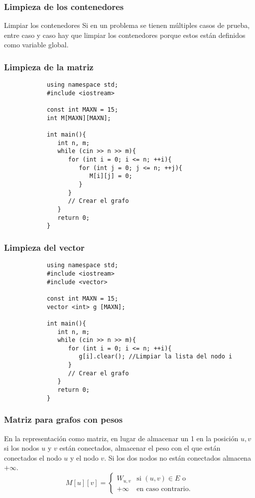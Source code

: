 \documentclass{beamer}
\begin{document}
	\begin{frame}[fragile]
		\frametitle{Limpieza de los contenedores}
		\begin{block}{Limpiar los contenedores}
			Si en un problema se tienen múltiples casos de prueba, entre caso y caso hay que limpiar los contenedores porque estos están definidos como variable global.
		\end{block}
	\end{frame}
	
	\begin{frame}[fragile]
		\frametitle{Limpieza de la matriz}
		\begin{lstlisting}
			using namespace std;
			#include <iostream>

			const int MAXN = 15;
			int M[MAXN][MAXN];

			int main(){
			   int n, m;
			   while (cin >> n >> m){
			      for (int i = 0; i <= n; ++i){
			         for (int j = 0; j <= n; ++j){
			            M[i][j] = 0;
			         }
			      }   
			      // Crear el grafo
			   }
			   return 0;
			}
		\end{lstlisting}
	\end{frame}
	
	\begin{frame}[fragile]
		\frametitle{Limpieza del vector}
		\begin{lstlisting}
			using namespace std;
			#include <iostream>
			#include <vector>

			const int MAXN = 15;
			vector <int> g [MAXN];

			int main(){
			   int n, m;
			   while (cin >> n >> m){ 
			      for (int i = 0; i <= n; ++i){
			         g[i].clear(); //Limpiar la lista del nodo i
			      }
			      // Crear el grafo
			   }
			   return 0;
			}
		\end{lstlisting}
	\end{frame}
	
	\begin{frame}
		\frametitle{Matriz para grafos con pesos}
		En la representación como matriz, en lugar de almacenar un 1 en la posición $u, v$ si los nodos $u$ y $v$ están conectados, almacenar el peso con el que están conectados el nodo $u$ y el nodo $v$. Si los dos nodos no están conectados almacena $+\infty$.
		\vfill
		\begin{equation}
			M[u][v] =
			\left\{
				\begin{array}{ll}
					W_{u,v} & \mbox{si } (u, v) \in E \mbox{ o} \\
					+\infty & \mbox{en caso contrario.} 
				\end{array}
			\right.
		\end{equation}
	\end{frame}
	
\end{document}
